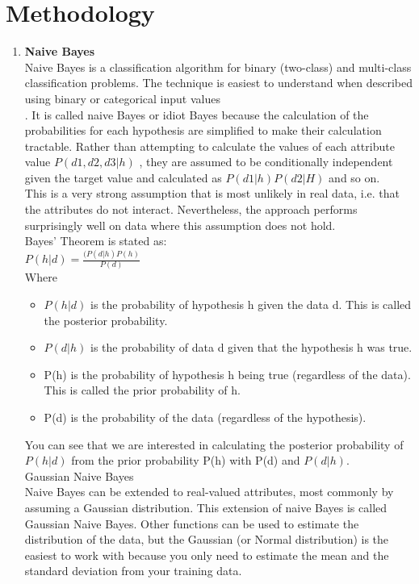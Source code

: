 \documentclass[a4paper, 11pt, oneside]{article} %
\begin{document}
\section{Methodology}
\begin {enumerate}
\item \textbf {Naive Bayes} \\
 Naive Bayes is a classification algorithm for binary (two-class) and multi-class classification problems. The technique is easiest to understand when described using binary or categorical input values\\.
It is called naive Bayes or idiot Bayes because the calculation of the probabilities for each hypothesis are simplified to make their calculation tractable. Rather than attempting to calculate the values of each attribute value $P(d1, d2, d3|h)$ , they are assumed to be conditionally independent given the target value and calculated as $P(d1|h)P(d2|H)$ and so on.\\
This is a very strong assumption that is most unlikely in real data, i.e. that the attributes do not interact. Nevertheless, the approach performs surprisingly well on data where this assumption does not hold.\\
Bayes’ Theorem is stated as: 
\\
$P(h|d) = \frac { (P(d|h)P(h)}{P(d)}$\\
Where\\
\begin{itemize}
\item$P(h|d)$ is the probability of hypothesis h given the data d. This is called the posterior probability.
\item$P(d|h)$ is the probability of data d given that the hypothesis h was true.
\item P(h) is the probability of hypothesis h being true (regardless of the data). This is called the prior probability of h.
\item P(d) is the probability of the data (regardless of the hypothesis).
\end{itemize}
You can see that we are interested in calculating the posterior probability of $P(h|d)$ from the prior probability P(h) with P(d) and $P(d|h)$.\\

Gaussian Naive Bayes\\
Naive Bayes can be extended to real-valued attributes, most commonly by assuming a Gaussian distribution.
This extension of naive Bayes is called Gaussian Naive Bayes. Other functions can be used to estimate the distribution of the data, but the Gaussian (or Normal distribution) is the easiest to work with because you only need to estimate the mean and the standard deviation from your training data.\\


\end{enumerate}
\end{document}
